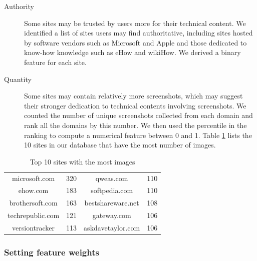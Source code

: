 \documentclass{www2010-submission}
\begin{document}
\begin{description}

\item[Authority] Some sites may be trusted by users more for their
  technical content. We identified a list of sites users
  may find authoritative, including sites hosted by software vendors
  such as Microsoft and Apple and those dedicated to know-how
  knowledge such as eHow and wikiHow. We derived a
  binary feature for each site.

\item[Quantity] Some sites may contain relatively more screenshots,
  which may suggest their stronger dedication to technical contents
  involving screenshots.  We counted the number of unique screenshots
  collected from each domain and rank all the domains by this
  number. We then used the percentile in the ranking to compute a
  numerical feature between 0 and 1. Table \ref{tbl:top10sites} lists
  the 10 sites in our database that have the most number of images.








\end{description}

\begin{table}
\centering \caption{Top 10 sites with the most images}
\label{tbl:top10sites}
\begin{tabular}{|c|c||c|c|}
\hline
microsoft.com & 320 & qweas.com & 110 \\
ehow.com & 183 & softpedia.com & 110 \\
brothersoft.com & 163 & bestshareware.net & 108 \\
techrepublic.com & 121 & gateway.com & 106 \\
versiontracker & 113  & askdavetaylor.com & 106 \\  
\hline
\end{tabular}
\end{table}


\subsubsection{Setting feature weights}
\end{document}
